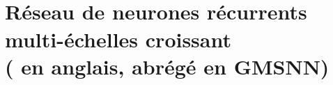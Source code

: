 \part[\Glsentrytext{project_gmsnn}]{\\[1em]{\Large Réseau de neurones récurrents multi-échelles croissant\\ ( en anglais, abrégé en GMSNN)}}\cleardoublepage
\cleardoublepage
\cleardoublepage
\cleardoublepage
\cleardoublepage
\cleardoublepage
\cleardoublepage